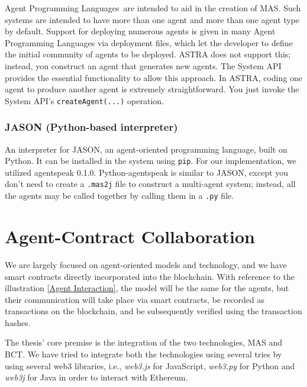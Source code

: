 \vspace{.5cm}
 
Agent Programming Languages are intended to aid in the creation of \ac{MAS}. Such systems are intended to have more than one agent and more than one agent type by default. Support for deploying numerous agents is given in many Agent Programming Languages via deployment files, which let the developer to define the initial community of agents to be deployed. \ac{ASTRA} does not support this; instead, you construct an agent that generates new agents. The System \ac{API} provides the essential functionality to allow this approach. In \ac{ASTRA}, coding one agent to produce another agent is extremely straightforward. You just invoke the System \ac{API}'s \texttt{createAgent(...)} operation.

\subsubsection{JASON (Python-based interpreter)}

An interpreter for JASON, an agent-oriented programming language, built on Python. It can be installed in the system using \texttt{\ac{pip}}. For our implementation, we utilized agentspeak 0.1.0. Python-agentspeak is similar to JASON, except you don't need to create a \texttt{.mas2j} file to construct a multi-agent system; instead, all the agents may be called together by calling them in a \texttt{.py} file.


\section{Agent-Contract Collaboration}

 
 We are largely focused on agent-oriented models and technology, and we have smart contracts directly incorporated into the blockchain. With reference to the illustration \ref{Agent Interaction}, the model will be the same for the agents, but their communication will take place via smart contracts, be recorded as transactions on the blockchain, and be subsequently verified using the transaction hashes.
 
 \vspace{.5cm}

The thesis' core premise is the integration of the two technologies, \ac{MAS} and \ac{BCT}. We have tried to integrate both the technologies using several tries by using several web3 libraries, i.e., \textit{web3.js} for JavaScript, \textit{web3.py} for Python and \textit{web3j} for Java in order to interact with Ethereum.

